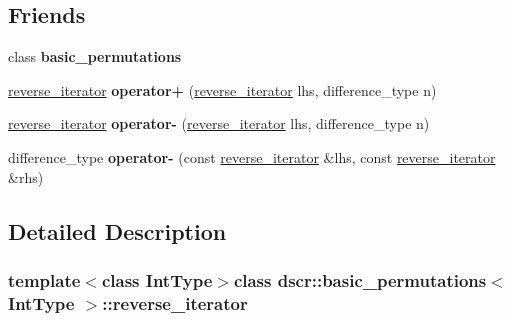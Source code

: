 \subsection*{Friends}
\begin{DoxyCompactItemize}
\item 
\hypertarget{classdscr_1_1basic__permutations_1_1reverse__iterator_a99f81faf0718d566d11f4d1a4ad187ba}{class {\bfseries basic\-\_\-permutations}}\label{classdscr_1_1basic__permutations_1_1reverse__iterator_a99f81faf0718d566d11f4d1a4ad187ba}

\item 
\hypertarget{classdscr_1_1basic__permutations_1_1reverse__iterator_a2c7fdd81f663381e951fb677763da73a}{\hyperlink{classdscr_1_1basic__permutations_1_1reverse__iterator}{reverse\-\_\-iterator} {\bfseries operator+} (\hyperlink{classdscr_1_1basic__permutations_1_1reverse__iterator}{reverse\-\_\-iterator} lhs, difference\-\_\-type n)}\label{classdscr_1_1basic__permutations_1_1reverse__iterator_a2c7fdd81f663381e951fb677763da73a}

\item 
\hypertarget{classdscr_1_1basic__permutations_1_1reverse__iterator_ad23e7d190001b7e889291da869e0e825}{\hyperlink{classdscr_1_1basic__permutations_1_1reverse__iterator}{reverse\-\_\-iterator} {\bfseries operator-\/} (\hyperlink{classdscr_1_1basic__permutations_1_1reverse__iterator}{reverse\-\_\-iterator} lhs, difference\-\_\-type n)}\label{classdscr_1_1basic__permutations_1_1reverse__iterator_ad23e7d190001b7e889291da869e0e825}

\item 
\hypertarget{classdscr_1_1basic__permutations_1_1reverse__iterator_a46fe9efd66cb5e2a2e89a93f2e060b82}{difference\-\_\-type {\bfseries operator-\/} (const \hyperlink{classdscr_1_1basic__permutations_1_1reverse__iterator}{reverse\-\_\-iterator} \&lhs, const \hyperlink{classdscr_1_1basic__permutations_1_1reverse__iterator}{reverse\-\_\-iterator} \&rhs)}\label{classdscr_1_1basic__permutations_1_1reverse__iterator_a46fe9efd66cb5e2a2e89a93f2e060b82}

\end{DoxyCompactItemize}


\subsection{Detailed Description}
\subsubsection*{template$<$class Int\-Type$>$class dscr\-::basic\-\_\-permutations$<$ Int\-Type $>$\-::reverse\-\_\-iterator}

